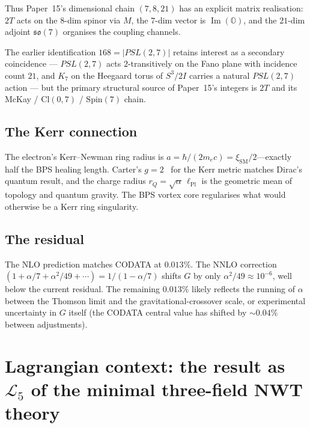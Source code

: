 \documentclass[11pt]{article}
\begin{document}
Thus Paper~15's dimensional chain $(7, 8, 21)$ has an explicit
matrix realisation: $2T$ acts on the $8$-dim spinor via $M$, the
$7$-dim vector is $\operatorname{Im}(\mathbb{O})$, and the $21$-dim
adjoint $\mathfrak{so}(7)$ organises the coupling channels.

The earlier identification $168 = |PSL(2,7)|$ retains interest as a
secondary coincidence --- $PSL(2,7)$ acts $2$-transitively on the
Fano plane with incidence count $21$, and $K_7$ on the Heegaard
torus of $S^3/2I$ carries a natural $PSL(2,7)$ action --- but the
primary structural source of Paper~15's integers is $2T$ and its
McKay / $\mathrm{Cl}(0,7)$ / $\mathrm{Spin}(7)$ chain.

\subsection{The Kerr connection}

The electron's Kerr--Newman ring radius is
$a = \hbar/(2m_e c) = \xi_\text{SM}/2$---exactly half the BPS
healing length.  Carter's $g = 2$~\cite{Carter1968} for the
Kerr metric matches Dirac's quantum result, and the charge
radius $r_Q = \sqrt{\alpha}\,\ell_\text{Pl}$ is the geometric
mean of topology and quantum gravity.  The BPS vortex core
regularises what would otherwise be a Kerr ring singularity.

\subsection{The residual}

The NLO prediction matches CODATA at $0.013\%$.  The NNLO
correction $(1 + \alpha/7 + \alpha^2/49 + \cdots) = 1/(1 -
\alpha/7)$ shifts $G$ by only $\alpha^2/49 \approx 10^{-6}$,
well below the current residual.  The remaining $0.013\%$ likely
reflects the running of $\alpha$ between the Thomson limit and
the gravitational-crossover scale, or experimental uncertainty
in $G$ itself (the CODATA central value has shifted by
$\sim 0.04\%$ between adjustments).


\section{Lagrangian context: the result as $\mathcal{L}_5$ of
the minimal three-field NWT theory}
\label{sec:lagrangian-context}
\end{document}
